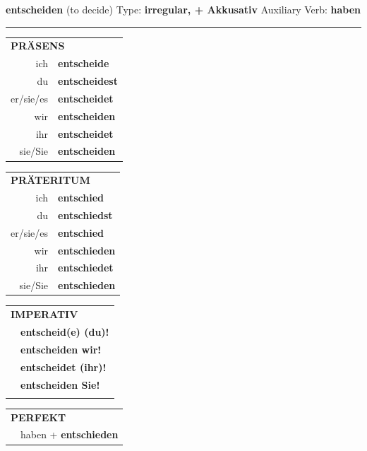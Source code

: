 \documentclass[10pt,a4paper]{revtex4-2}
\begin{document}
\begin{verbbox-acc}
    {\Large \bf entscheiden} (to decide) \hfill Type: \textbf{irregular, + Akkusativ} \hfill Auxiliary Verb: \textbf{haben} 
    
     \vspace{5pt}

    \hrule
    
    \vspace{5pt}

  \begin{tabular}{rl}
     \multicolumn{2}{l}{\textbf{PRÄSENS} }\\
    ich & \textbf{entscheide}\\
    du & \textbf{entscheidest}\\
    er/sie/es & \textbf{entscheidet}\\
    wir & \textbf{entscheiden}\\
    ihr & \textbf{entscheidet}\\
    sie/Sie & \textbf{entscheiden}\\
  \end{tabular}
  \hfill
     \begin{tabular}{rl}
    \multicolumn{2}{l}{\textbf{PRÄTERITUM} }\\
    ich & \textbf{entschied}\\
    du & \textbf{entschiedst}\\
    er/sie/es & \textbf{entschied}\\
    wir & \textbf{entschieden}\\
    ihr & \textbf{entschiedet}\\
    sie/Sie & \textbf{entschieden}\\
  \end{tabular}
  \hfill
  \begin{tabular}{rl}
     \multicolumn{2}{l}{\textbf{IMPERATIV} }\\
   & \textbf{entscheid(e) (du)!}\\
   & \textbf{entscheiden wir!}\\
   & \textbf{entscheidet (ihr)!}\\
   & \textbf{entscheiden Sie!}\\
   & \vspace{10pt}
  \end{tabular}

    \vspace{10pt}

 \begin{tabular}{rl}
     \multicolumn{2}{l}{\textbf{PERFEKT}}\\
  &  haben + \textbf{entschieden}\\
  \end{tabular}
\hfill
   \begin{tabular}{rl}
   

\end{tabular}
\end{verbbox-acc}
\end{document}
